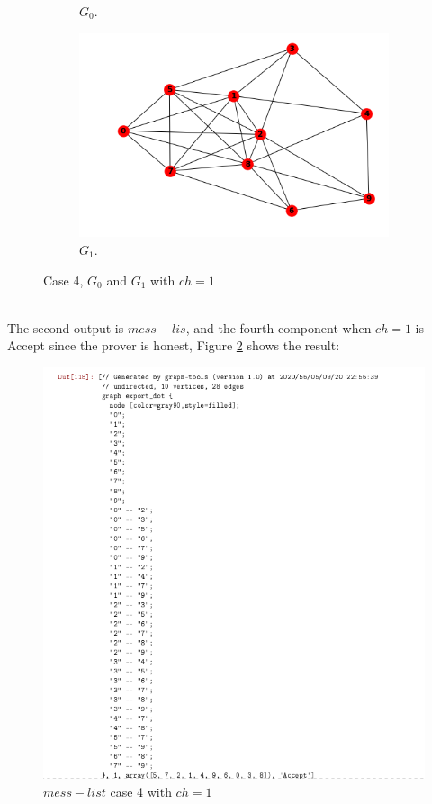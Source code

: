 \documentclass[12pt,a4paper]{article}
\begin{document}
\begin{itemize}
\begin{figure}[h!]
\begin{subfigure}[b]{.45\linewidth}
		\caption{$G_0$.}
	\end{subfigure}
	\begin{subfigure}[b]{.45\linewidth}
		\includegraphics[width=\linewidth]{3-27.png}
		\caption{$G_1$.}
	\end{subfigure}
	\caption{Case 4, $G_0$ and $G_1$ with $ch=1$}
	\label{fig:case 4,$G_0$ and $G_1$, with $ch=1$}
\end{figure}\\
The second output is $mess-lis$, and the fourth component when $ch=1$ is Accept since the prover is honest, Figure \ref{fig:3-28} shows the result:\\
\begin{figure}[h]
	\centering
	\includegraphics[width=0.95\linewidth]{3-28}
	\caption{$mess-list$ case 4 with $ch=1$}
	\label{fig:3-28}
\end{figure}\\
\end{itemize}

%
%
\end{document}
